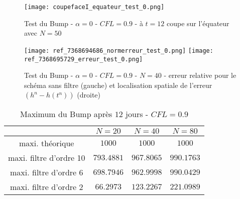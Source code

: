 \begin{figure}[ht]
\begin{center}
\texttt{[image: coupefaceI\_equateur\_test\_0.png]}
\caption{Test du Bump - $\alpha = 0$ - $CFL=0.9$ - à $t=12$ coupe sur l'équateur avec $N=50$}
\label{table adv4}
\end{center}
\end{figure}

\begin{figure}[ht]
\begin{center}
\texttt{[image: ref\_7368694686\_normerreur\_test\_0.png]}
\texttt{[image: ref\_7368695729\_erreur\_test\_0.png]}
\caption{Test du Bump - $\alpha = 0$ - $CFL=0.9$ - $N=40$ - erreur relative pour le schéma sans filtre (gauche) et localisation spatiale de l'erreur $( h^n - h(t^n))$ (droite)}
\label{table adv5}
\end{center}
\end{figure}


\begin{table}[ht]
\begin{center}
\begin{tabular}{c|ccc}
\hline
 & $N=20$ &$N=40$ &$N=80$\\
\hline 
\hline
maxi. théorique & $1000$ & $1000$ & $1000$ \\ 
\hline 
maxi. filtre d'ordre 10 & $793.4881$& $967.8065$ & $990.1763$  \\ 
\hline 
maxi. filtre d'ordre 6 & $698.7946$& $962.9998$ & $990.0429$  \\ 
\hline 
maxi. filtre d'ordre 2 & $66.2973$ & $123.2267$ & $221.0989$  \\ 
\hline 
\end{tabular} 
\caption{Maximum du Bump après $12$ jours - $CFL=0.9$}
\end{center}
\end{table}





